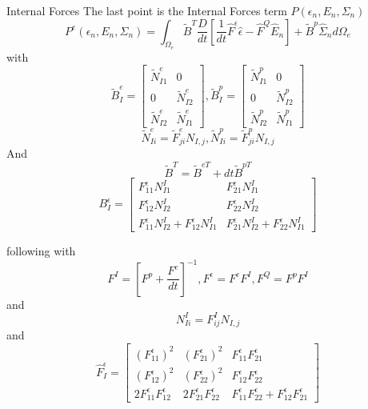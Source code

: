 \begin{frame}{Internal Forces}
The last point is the Internal Forces term $P(\epsilon_n, E_n, \Sigma_n)$
\begin{equation}
P^e(\epsilon_n, E_n, \Sigma_n) = \int_{\Omega_e} \tilde{B}^T \frac{D}{dt} \left[\frac{1}{dt}\hat{F}^{\epsilon} \hat{\epsilon} - \hat{F}^Q \hat{E}_n \right] + \tilde{B}^p \hat{\Sigma}_n d\Omega_e
\end{equation}
with
\begin{equation*}
\tilde{B}^e_I = \begin{bmatrix}
\tilde{N}^e_{I1}&0\\0&\tilde{N}^e_{I2}\\\tilde{N}^e_{I2}&\tilde{N}^e_{I1}
\end{bmatrix}, \tilde{B}^p_I = \begin{bmatrix}
\tilde{N}^p_{I1}&0\\0&\tilde{N}^p_{I2}\\\tilde{N}^p_{I2}&\tilde{N}^p_{I1}
\end{bmatrix}
\end{equation*}
\begin{equation*}
\tilde{N}^e_{Ii} = \tilde{F}^e_{ji}N_{I,j}, \tilde{N}^p_{Ii} = \tilde{F}^p_{ji}N_{I,j}
\end{equation*}
And
\begin{equation*}
\tilde{B}^T = \tilde{B}^{eT}+dt \tilde{B}^{pT}
\end{equation*}
\begin{equation*}
B^\epsilon_I = \begin{bmatrix}
F^\epsilon_{11}N^I_{I1}&F^\epsilon_{21}N^I_{I1}\\
F^\epsilon_{12}N^I_{I2}&F^\epsilon_{22}N^I_{I2}\\
F^\epsilon_{11}N^I_{I2}+F^\epsilon_{12}N^I_{I1}& F^\epsilon_{21}N^I_{I2}+F^\epsilon_{22}N^I_{I1}
\end{bmatrix}
\end{equation*}
\end{frame}
\begin{frame}{following}
with
\begin{equation*}
F^I = \left[ F^p+\frac{F^e}{dt} \right]^{-1}, F^\epsilon = F^eF^I, F^Q=F^pF^I
\end{equation*}
and 
\begin{equation*}
N^I_{Ii} = F^I_{ij}N_{I,j}
\end{equation*}
and
\begin{equation*}
\hat{F}^\epsilon_I = \begin{bmatrix}
(F^\epsilon_{11})^2&(F^\epsilon_{21})^2& F^\epsilon_{11}F^\epsilon_{21}\\
(F^\epsilon_{12})^2&(F^\epsilon_{22})^2&F^\epsilon_{12}F^\epsilon_{22}\\
2F^\epsilon_{11}F^\epsilon_{12}&2 F^\epsilon_{21}F^\epsilon_{22}& F^\epsilon_{11}F^\epsilon_{22}+F^\epsilon_{12}F^\epsilon_{21}
\end{bmatrix}
\end{equation*}
\end{frame}